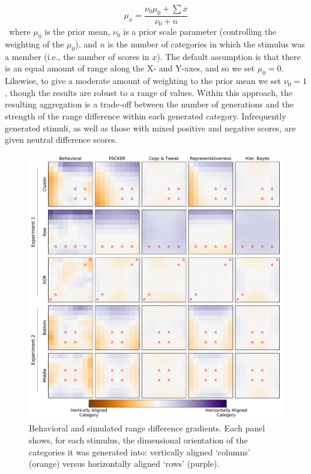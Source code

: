 \documentclass[12pt]{article}
\begin{document}
\begin{flushleft}
\begin{equation} \mu_x = \dfrac { \nu_0 \mu_0 + \sum{x} } { \nu_0 + n }
\label{eq:rangediff-bayes}
\end{equation} \ where $\mu_0$ is the prior mean, $\nu_0$ is a prior scale
parameter (controlling the weighting of the $\mu_0$), and $n$ is the number of
categories in which the stimulus was a member (i.e., the number of scores in
$x$). The default assumption is that there is an equal amount of range along the
X- and Y-axes, and so we set $\mu_0 = 0$. Likewise, to give a moderate amount of
weighting to the prior mean we set $\nu_0 = 1$, though the results are robust to
a range of values. Within this approach, the resulting aggregation is a
trade-off between the number of generations and the strength of the range
difference within each generated category. Infrequently generated stimuli, as
well as those with mixed positive and negative scores, are given neutral
difference scores.

\begin{figure}[p]
    \begin{center} 
      \includegraphics[width=\textwidth]{figs/range-diff-gradients.pdf}
      \caption{Behavioral and simulated range difference gradients. Each panel
        shows, for each stimulus, the dimensional orientation of the categories
        it was generated into: vertically aligned `columns' (orange) versus
        horizontally aligned `rows' (purple).}
      \label{fig:range-diff-gradients}
    \end{center}
\end{figure}


\end{flushleft}
\end{document}
